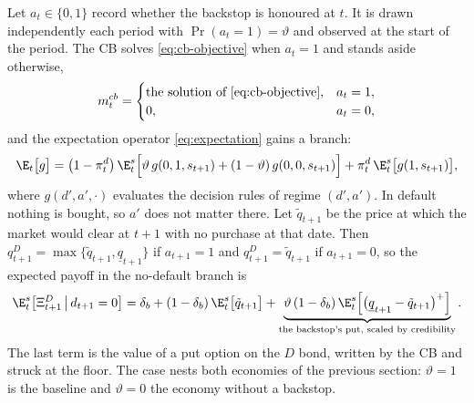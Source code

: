 \begin{yaddblock}
Let $a_t\in\{0,1\}$ record whether the backstop is honoured at $t$. It is drawn
independently each period with $\Pr(a_t=1)=\vartheta$ and observed at the start of
the period. The CB solves \eqref{eq:cb-objective} when $a_t=1$ and stands aside
otherwise,
\begin{equation}
m^{cb}_t=
\begin{cases}
\text{the solution of \eqref{eq:cb-objective}}, & a_t=1,\\
0, & a_t=0,
\end{cases}
\label{eq:cb-uncertain}
\end{equation}
and the expectation operator \eqref{eq:expectation} gains a branch:
\begin{equation}
\E_t\bigl[g\bigr]
=\bigl(1-\pi^{d}_t\bigr)\,\E^{s}_t\Bigl[\vartheta\,g(0,1,s_{t+1})+(1-\vartheta)\,g(0,0,s_{t+1})\Bigr]
+\pi^{d}_t\,\E^{s}_t\bigl[g(1,s_{t+1})\bigr],
\label{eq:expectation-uncertain}
\end{equation}
where $g(d',a',\cdot)$ evaluates the decision rules of regime $(d',a')$. In default
nothing is bought, so $a'$ does not matter there. Let $\tilde q_{t+1}$ be the price
at which the market would clear at $t+1$ with no purchase at that date. Then
$q^{D}_{t+1}=\max\{\tilde q_{t+1},\underline q_{t+1}\}$ if $a_{t+1}=1$ and
$q^{D}_{t+1}=\tilde q_{t+1}$ if $a_{t+1}=0$, so the expected payoff in the
no-default branch is
\begin{equation}
\E^{s}_t\bigl[\Xi^{D}_{t+1}\,\big|\,d_{t+1}=0\bigr]
=\delta_b+(1-\delta_b)\,\E^{s}_t\bigl[\tilde q_{t+1}\bigr]
+\underbrace{\vartheta\,(1-\delta_b)\,\E^{s}_t\Bigl[\bigl(\underline q_{t+1}-\tilde q_{t+1}\bigr)^{+}\Bigr]}_{\text{the backstop's put, scaled by credibility}} .
\label{eq:put-uncertain}
\end{equation}
The last term is the value of a put option on the $D$ bond, written by the CB and
struck at the floor. The case nests both economies of the previous section:
$\vartheta=1$ is the baseline and $\vartheta=0$ the economy without a backstop.


\end{yaddblock}
